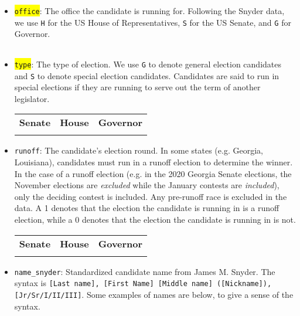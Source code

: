 \documentclass[12pt]{article}
\begin{document}
\begin{itemize}[leftmargin=*]

\item \colorbox{yellow}{\texttt{office}}: The office the candidate is running for. Following the Snyder data, we use \texttt{H} for the US House of Representatives, \texttt{S} for the US Senate, and \texttt{G} for Governor. 

    \begin{tabularx}{\linewidth}{C}
    
    \end{tabularx}
			

\item \colorbox{yellow}{\texttt{type}}: The type of election. We use \texttt{G} to denote general election candidates and \texttt{S} to denote special election candidates. Candidates are said to run in special elections if they are running to serve out the term of another legislator. 

\begin{tabularx}{\linewidth}{CCC}
    \textbf{Senate} & \textbf{House} & \textbf{Governor}\\
     &  & 
\end{tabularx}

\item \texttt{runoff}: The candidate's election round. In some states (e.g. Georgia, Louisiana), candidates must run in a runoff election to determine the winner. In the case of a runoff election (e.g. in the 2020 Georgia Senate elections, the November elections are \textit{excluded} while the January contests are \textit{included}), only the deciding contest is included. Any pre-runoff race is excluded in the data. A 1 denotes that the election the candidate is running in is a runoff election, while a 0 denotes that the election the candidate is running in is not. 

\begin{tabularx}{\linewidth}{CCC}
    \textbf{Senate} & \textbf{House} & \textbf{Governor}\\
     &  & 
\end{tabularx}

\item \texttt{name\_snyder}: Standardized candidate name from James M. Snyder.  The syntax is \texttt{[Last name], [First Name] [Middle name] ([Nickname]), [Jr/Sr/I/II/III]}.  Some examples of names are below, to give a sense of the syntax.


\end{itemize}
\end{document}
